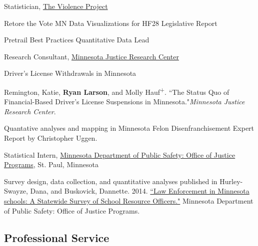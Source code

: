 \documentclass[letterpaper]{article}
\newenvironment{publist}{%
  \begin{list}{}{%
    \setlength{\leftmargin}{0cm}   %
    \setlength{\labelwidth}{2cm}     %
    \setlength{\labelsep}{0.5cm}     %
  }%
}{%
  \end{list}%
}
\renewenvironment{itemize}{
  \begin{list}{}{
    \setlength{\leftmargin}{1.5em}
  }
}{
  \end{list}
}
\begin{document}
\begin{publist}
\item[\textbf{2024-present}] Statistician, \href{https://www.theviolenceproject.org/}{The Violence Project}
\item[\textbf{2023}] Retore the Vote MN Data Visualizations for HF28 Legislative Report
\item[\textbf{2023-present}] Pretrail Best Practices Quantitative Data Lead
\item[\textbf{2022-present}] Research Consultant, \href{https://www.mnjrc.org/about-us}{Minnesota Justice Research Center}

\item[\textbf{2022}] Driver's License Withdrawals in Minnesota

\begin{itemize}

\item Remington, Katie, \textbf{Ryan Larson}, and Molly Hauf\textsuperscript{+}. ``The Status Quo of Financial-Based Driver's License Suspensions in Minnesota."\textit{Minnesota Justice Research Center}.

\end{itemize}

\item[\textbf{2020}] Quantative analyses and mapping in Minnesota Felon Disenfranchisement Expert Report by Christopher Uggen.

\item[\textbf{2013}] Statistical Intern, \href{https://dps.mn.gov/divisions/ojp/statistical-analysis-center/Pages/default.aspx}{Minnesota Department of Public Safety: Office of Justice Programs}, St. Paul, Minnesota
\begin{itemize}
	\item Survey design, data collection, and quantitative analyses published in Hurley-Swayze, Dana, and  Buskovick, Dannette. 2014. \href{https://dps.mn.gov/divisions/ojp/forms-documents/Documents/SRO20REPORT.pdf}{``Law Enforcement in Minnesota schools: A Statewide Survey of School Resource Officers."} Minnesota Department of Public Safety: Office of Justice Programs.
\end{itemize}

\end{publist}

\subsection*{Professional Service}
\end{document}
